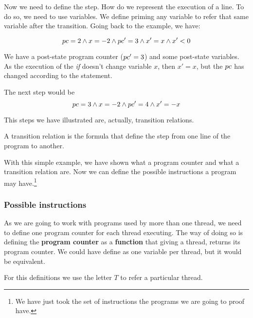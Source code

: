 Now we need to define the step. How do we represent the execution of a line. To do so, we need to use  variables. We define priming any variable to refer that same variable after the transition. Going back to the example, we have:

\[
pc = 2 \wedge x=-2 \wedge pc'=3 \wedge x'=x \wedge x' < 0
\]

We have a post-state program counter ($pc'=3$) and some post-state variables. 
As the execution of the \textit{if} doesn't change variable $x$, then $x'=x$, but the $pc$ has changed according to the statement.

The next step would be
\[
pc = 3 \wedge x=-2 \wedge 	pc'=4 \wedge x'= -x 
\]

This steps we have illustrated are, actually, transition relations.

\begin{defn}
A transition relation is the formula that define the step from one line of the program to another.  
\end{defn}

With this simple example, we have shown what a program counter and what a transition relation are. Now we can define the possible instructions a program may have.\footnote{We have just took the set of instructions the programs we are going to proof have.}



\subsubsection{Possible instructions}
As we are going to work with programs used by more than one thread, we need to define one program counter for each thread executing. The way of doing so is defining the \textbf{program counter} as a \textbf{function} that giving a thread, returns its program counter. 
We could have define as one variable per thread, but it would be equivalent. 

For this definitions we use the letter $T$ to refer a particular thread.


